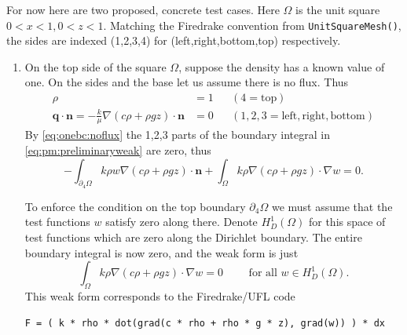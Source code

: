 \documentclass[11pt]{article}
\newcommand{\bn}{\mathbf{n}}
\newcommand{\bq}{\mathbf{q}}
\newcommand{\grad}{\nabla}
\begin{document}
For now here are two proposed, concrete test cases.  Here $\Omega$ is the unit square $0<x<1,0<z<1$.  Matching the Firedrake convention from \texttt{UnitSquareMesh()}, the sides are indexed (1,2,3,4) for (left,right,bottom,top) respectively.

\begin{enumerate}
\item On the top side of the square $\Omega$, suppose the density has a known value of one.  On the sides and the base let us assume there is no flux.  Thus
\begin{subequations}
\begin{align}
\rho &= 1 & &(4=\text{top}) \label{eq:onebc:dirichlet} \\
\bq \cdot \bn = - \frac{k}{\mu} \grad(c\rho + \rho g z) \cdot \bn &= 0 & &(1,2,3=\text{left},\text{right},\text{bottom}) \label{eq:onebc:noflux}
\end{align}
\end{subequations}
By \eqref{eq:onebc:noflux} the 1,2,3 parts of the boundary integral in \eqref{eq:pm:preliminaryweak} are zero, thus
	$$- \int_{\partial_4\Omega} k \rho w \grad\left(c \rho + \rho g z\right) \cdot \bn + \int_\Omega k \rho \grad\left(c \rho + \rho g z\right) \cdot \grad w = 0.$$

To enforce the condition on the top boundary $\partial_4\Omega$ we must assume that the test functions $w$ satisfy zero along there.  Denote $H_D^1(\Omega)$ for this space of test functions which are zero along the Dirichlet boundary.  The entire boundary integral is now zero, and the weak form is just
\begin{equation}
\int_\Omega k\rho \grad\left(c\rho + \rho g z\right) \cdot \grad w = 0 \qquad \text{ for all } w \in H_D^1(\Omega).\label{eq:pm:weakone}
\end{equation}
This weak form corresponds to the Firedrake/UFL code
\begin{Verbatim}[fontsize=\small]
    F = ( k * rho * dot(grad(c * rho + rho * g * z), grad(w)) ) * dx
\end{Verbatim}


\end{enumerate}
\end{document}
